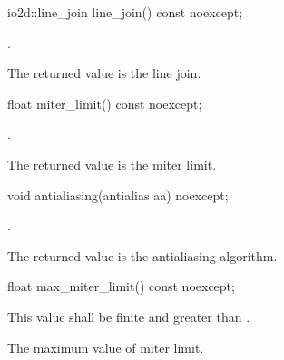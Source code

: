 %
\begin{itemdecl}
io2d::line_join line_join() const noexcept;
\end{itemdecl}
\begin{itemdescr}
\pnum
\returns
{}.

\pnum
\remarks
The returned value is the line join.
\end{itemdescr}

%
\begin{itemdecl}
float miter_limit() const noexcept;
\end{itemdecl}
\begin{itemdescr}
\pnum
\returns
{}.

\pnum
\remarks
The returned value is the miter limit.
\end{itemdescr}

%
\begin{itemdecl}
void antialiasing(antialias aa) noexcept;
\end{itemdecl}
\begin{itemdescr}
\pnum
\returns
{}.

\pnum
\remarks
The returned value is the antialiasing algorithm.
\end{itemdescr}

%
\begin{itemdecl}
float max_miter_limit() const noexcept;
\end{itemdecl}
\begin{itemdescr}
\pnum
\requires
This value shall be finite and greater than .

\pnum
\returns
The  maximum value of miter limit.
\end{itemdescr}
